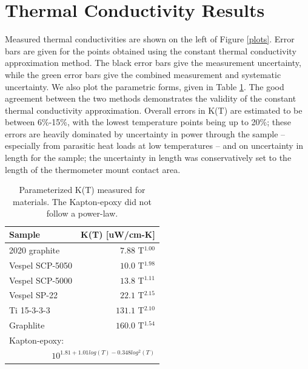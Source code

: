 \documentclass[final]{svjour2}
\begin{document}
\section{Thermal Conductivity Results}
Measured thermal conductivities are shown on the left of Figure \ref{plots}. Error bars are given for the points obtained using the constant thermal conductivity approximation method. The black error bars give the measurement uncertainty, while the green error bars give the combined measurement and systematic uncertainty. We also plot the parametric forms, given in Table \ref{cond_table}. The good agreement between the two methods demonstrates the validity of the constant thermal conductivity approximation. Overall errors in K(T) are estimated to be between 6\%-15\%, with the lowest temperature points being up to 20\%; these errors are heavily dominated by uncertainty in power through the sample -- especially from parasitic heat loads at low temperatures -- and on uncertainty in length for the sample; the uncertainty in length was conservatively set to the length of the thermometer mount contact area.

\begin{table}
\centering
\small
\begin{threeparttable}
\begin{tabular}{lr}
\toprule
Sample & K(T) [uW/cm-K] \\
\midrule
2020 graphite & $7.88$ T$^{1.00}$ \\
Vespel SCP-5050 & $10.0$ T$^{1.98}$ \\
Vespel SCP-5000 & $13.8$ T$^{1.11}$ \\
Vespel SP-22 & $22.1$ T$^{2.15}$ \\
Ti 15-3-3-3 & $131.1$ T$^{2.10}$ \\
Graphlite & $160.0$ T$^{1.54}$ \\
Kapton-epoxy: & \\
\multicolumn{2}{r}{$10^{1.81 + 1.01log(T) - 0.348log^2(T)}$} \\
\bottomrule
\end{tabular}
\caption{{\small Parameterized K(T) measured for materials. The Kapton-epoxy did not follow a power-law.}}
\label{cond_table}
\end{threeparttable}
\end{table}
\end{document}
